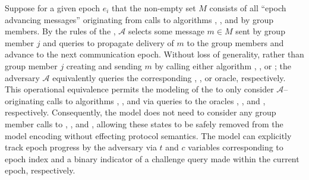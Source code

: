 \documentclass[runningheads]{llncs}
\newcommand{\Adversary}{\ensuremath{\mathcal{A}}\xspace}
\begin{document}
Suppose for a given epoch $e_i$ that the non-empty set $M$ consists of all ``epoch advancing messages'' originating from calls to algorithms , , and  by group members.
By the rules of the \CGKAsec, \Adversary selects some message $m \in M$ sent by group member $j$ and queries  to propagate delivery of $m$ to the group members and advance to the next communication epoch.
Without loss of generality, rather than group member $j$ creating and sending $m$ by calling either algorithm , , or ; the adversary \Adversary equivalently queries the corresponding , , or  oracle, respectively.
This operational equivalence permits the modeling of the \CGKAsec to only consider \Adversary--originating calls to algorithms , , and  via queries to the oracles , , and , respectively.
Consequently, the model does not need to consider any group member calls to , , and , allowing these states to be safely removed from the model encoding without effecting protocol semantics.
The model can explicitly track epoch progress by the adversary via $t$ and $c$ variables corresponding to epoch index and a binary indicator of a challenge query made within the current epoch, respectively.
\end{document}
